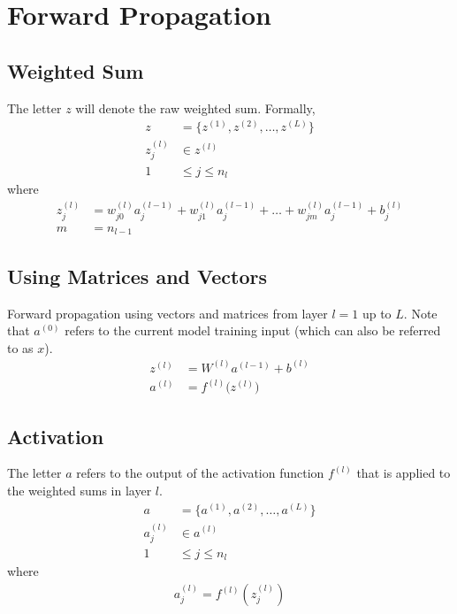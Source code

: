 \documentclass[12pt]{article}
\begin{document}
\section*{Forward Propagation}
\subsection*{Weighted Sum}
The letter $z$ will denote the raw weighted sum. Formally,
\begin{align*}
    z &= \{z^{(1)}, z^{(2)}, \ldots, z^{(L)}\}\\
    z_j^{(l)} &\in z^{(l)}\\
    1 &\leq j \leq n_l
\end{align*}
where
\begin{align*}
    z_j^{(l)} &= w_{j0}^{(l)}a_j^{(l-1)} + w_{j1}^{(l)}a_j^{(l-1)} + \ldots + w_{jm}^{(l)}a_j^{(l-1)} + b_j^{(l)}\\
    m &= n_{l-1}
\end{align*}

\subsection*{Using Matrices and Vectors}
Forward propagation using vectors and matrices from layer $l=1$ up to $L$. Note that $a^{(0)}$ refers to the current model training input (which can also be referred to as $x$).
\begin{align*}
    z^{(l)} &= W^{(l)}a^{(l-1)}+b^{(l)}\\
    a^{(l)} &= f^{(l)} \big( z^{(l)} \big)
\end{align*}

\subsection*{Activation}
The letter $a$ refers to the output of the activation function $f^{(l)}$ that is applied to the weighted sums in layer $l$.
\begin{align*}
    a &= \{a^{(1)}, a^{(2)}, \ldots, a^{(L)}\}\\
    a_j^{(l)} &\in a^{(l)}\\
    1 &\leq j \leq n_l
\end{align*}
where
\begin{align*}
    a_j^{(l)} = f^{(l)}(z_j^{(l)})
\end{align*}
\end{document}
